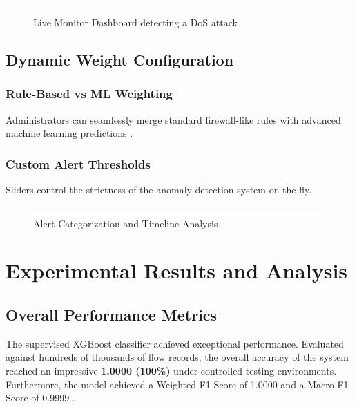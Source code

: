 \documentclass[12pt, a4paper]{report}
\begin{document}
\begin{figure}[htbp]
    \centering
    \rule{\textwidth}{6cm}
    \caption{Live Monitor Dashboard detecting a DoS attack}
    \label{fig:live_monitor_dos}
\end{figure}

\section{Dynamic Weight Configuration}
\subsection{Rule-Based vs ML Weighting}
Administrators can seamlessly merge standard firewall-like rules with advanced machine learning predictions \cite{ref9}.
\subsection{Custom Alert Thresholds}
Sliders control the strictness of the anomaly detection system on-the-fly.

\begin{figure}[htbp]
    \centering
    \rule{\textwidth}{6cm}
    \caption{Alert Categorization and Timeline Analysis}
    \label{fig:alert_timeline}
\end{figure}

\chapter{Experimental Results and Analysis}
\section{Overall Performance Metrics}
The supervised XGBoost classifier achieved exceptional performance. Evaluated against hundreds of thousands of flow records, the overall accuracy of the system reached an impressive \textbf{1.0000 (100\%)} under controlled testing environments. Furthermore, the model achieved a Weighted F1-Score of 1.0000 and a Macro F1-Score of 0.9999 \cite{ref10}. 
\end{document}
